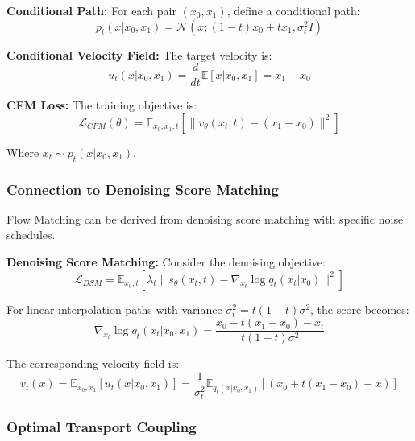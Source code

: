\documentclass[a4paper,12pt]{article}
\begin{document}
\textbf{Conditional Path:} For each pair $(x_0, x_1)$, define a conditional path:
\begin{equation}
p_t(x | x_0, x_1) = \mathcal{N}\left(x; (1-t)x_0 + t x_1, \sigma_t^2 I\right)
\label{eq:conditional_path}
\end{equation}

\textbf{Conditional Velocity Field:} The target velocity is:
\begin{equation}
u_t(x | x_0, x_1) = \frac{d}{dt} \mathbb{E}[x | x_0, x_1] = x_1 - x_0
\label{eq:conditional_velocity}
\end{equation}

\textbf{CFM Loss:} The training objective is:
\begin{equation}
\mathcal{L}_{CFM}(\theta) = \mathbb{E}_{x_0, x_1, t} \left[ \| v_\theta(x_t, t) - (x_1 - x_0) \|^2 \right]
\label{eq:cfm_loss}
\end{equation}

Where $x_t \sim p_t(x | x_0, x_1)$.

\subsubsection{Connection to Denoising Score Matching}

Flow Matching can be derived from denoising score matching with specific noise schedules.

\textbf{Denoising Score Matching:} Consider the denoising objective:
\begin{equation}
\mathcal{L}_{DSM} = \mathbb{E}_{x_0, t} \left[ \lambda_t \| s_\theta(x_t, t) - \nabla_{x_t} \log q_t(x_t | x_0) \|^2 \right]
\label{eq:dsm_loss}
\end{equation}

For linear interpolation paths with variance $\sigma_t^2 = t(1-t)\sigma^2$, the score becomes:
\begin{equation}
\nabla_{x_t} \log q_t(x_t | x_0, x_1) = \frac{x_0 + t(x_1 - x_0) - x_t}{t(1-t)\sigma^2}
\label{eq:score_linear}
\end{equation}

The corresponding velocity field is:
\begin{equation}
v_t(x) = \mathbb{E}_{x_0, x_1} [u_t(x | x_0, x_1)] = \frac{1}{\sigma_t^2} \mathbb{E}_{q_t(x | x_0, x_1)} [(x_0 + t(x_1 - x_0) - x)]
\label{eq:velocity_from_score}
\end{equation}

\subsubsection{Optimal Transport Coupling}
\end{document}
